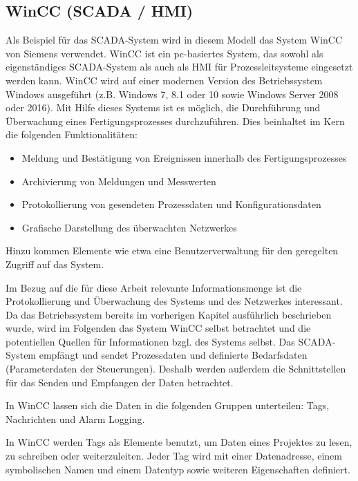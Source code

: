 \subsection{WinCC (SCADA / HMI)}
Als Beispiel für das SCADA-System wird in diesem Modell das System \glqq WinCC\grqq{} von Siemens verwendet. WinCC ist ein pc-basiertes System, das sowohl als eigenständiges SCADA-System als auch als HMI für Prozessleitsysteme eingesetzt werden kann. WinCC wird auf einer modernen Version des Betriebssystem Windows ausgeführt (z.B. Windows 7, 8.1 oder 10 sowie Windows Server 2008 oder 2016). Mit Hilfe dieses Systems ist es möglich, die Durchführung und Überwachung eines Fertigungsprozesses durchzuführen\citep{WinCC2}. Dies beinhaltet im Kern die folgenden Funktionalitäten\citep{WinCC1}:
\begin{itemize}
\item Meldung und Bestätigung von Ereignissen innerhalb des Fertigungsprozesses
\item Archivierung von Meldungen und Messwerten
\item Protokollierung von gesendeten Prozessdaten und Konfigurationsdaten
\item Grafische Darstellung des überwachten Netzwerkes
\end{itemize}


Hinzu kommen Elemente wie etwa eine Benutzerverwaltung für den geregelten Zugriff auf das System.

Im Bezug auf die für diese Arbeit relevante Informationsmenge ist die Protokollierung und Überwachung des Systems und des Netzwerkes interessant. Da das Betriebssystem bereits im vorherigen Kapitel ausführlich beschrieben wurde, wird im Folgenden das System \glqq WinCC\grqq{} selbst betrachtet und die potentiellen Quellen für Informationen bzgl. des Systems selbst. Das SCADA-System empfängt und sendet Prozessdaten und definierte Bedarfsdaten (Parameterdaten der Steuerungen). Deshalb werden außerdem die Schnittstellen für das Senden und Empfangen der Daten betrachtet.

In WinCC lassen sich die Daten in die folgenden Gruppen unterteilen: Tags, Nachrichten und Alarm Logging. 


In WinCC werden \glqq Tags\grqq{} als Elemente benutzt, um Daten eines Projektes zu lesen, zu schreiben oder weiterzuleiten. Jeder Tag wird mit einer Datenadresse, einem symbolischen Namen und einem Datentyp sowie weiteren Eigenschaften definiert.

